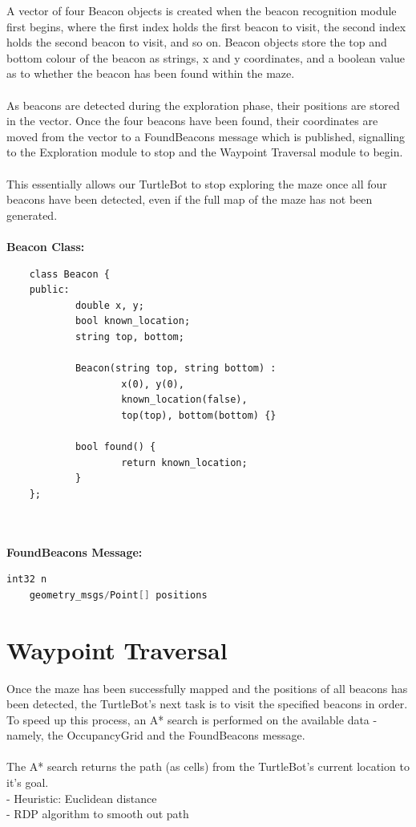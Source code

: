 \documentclass[titlepage,12pt,a4paper]{article}
\begin{document}
A vector of four Beacon objects is created when the beacon recognition module first begins, where the first index holds the first beacon to visit, the second index holds the second beacon to visit, and so on. Beacon objects store the top and bottom colour of the beacon as strings, x and y coordinates, and a boolean value as to whether the beacon has been found within the maze. \\
\\
As beacons are detected during the exploration phase, their positions are stored in the vector. Once the four beacons have been found, their coordinates are moved from the vector to a FoundBeacons message which is published, signalling to the Exploration module to stop and the Waypoint Traversal module to begin.\\
\\
This essentially allows our TurtleBot to stop exploring the maze once all four beacons have been detected, even if the full map of the maze has not been generated.\\
\\
\textbf{Beacon Class:}
\begin{lstlisting}
	class Beacon {
	public:
    		double x, y;
    		bool known_location;
    		string top, bottom;

    		Beacon(string top, string bottom) :
        			x(0), y(0),
        			known_location(false),
        			top(top), bottom(bottom) {}

    		bool found() {
        			return known_location;
    		}
	};
	
\end{lstlisting}

\textbf{\\FoundBeacons Message:}
\begin{lstlisting}[language=C++]
	int32 n
	geometry_msgs/Point[] positions
\end{lstlisting}


\pagebreak


\section*{Waypoint Traversal}

Once the maze has been successfully mapped and the positions of all beacons has been detected, the TurtleBot's next task is to visit the specified beacons in order. To speed up this process, an A* search is performed on the available data - namely, the OccupancyGrid and the FoundBeacons message.\\
\\
The A* search returns the path (as cells) from the TurtleBot's current location to it's goal.
\\
- Heuristic: Euclidean distance \\
- RDP algorithm to smooth out path
\end{document}
